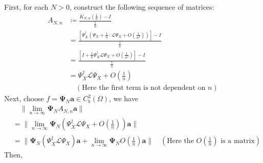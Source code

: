 \documentclass{article}[11]
\begin{document}
First, for each $N>0$, construct the following sequence of matrices:
\begin{align*}
	A_{N,n} &\coloneqq \frac{ K_{N,n}\left( \tfrac{1}{n} \right)  - I }{\tfrac{1}{n}} \\
	&= \frac{ \left[\Psi_X^{\dagger}\left(\Psi_X + \tfrac{1}{n} \cdot \mathcal{L}\Psi_X + O(\tfrac{1}{n^2})\right)\right]  - I }{\tfrac{1}{n}} \\
	&= \frac{ \left[I + \tfrac{1}{n}\Psi_X^{\dagger}\mathcal{L}\Psi_X + O(\tfrac{1}{n^2})\right]  - I }{\tfrac{1}{n}} \\
	&= \Psi_X^{\dagger}\mathcal{L}\Psi_X + O(\tfrac{1}{n}) \\
	&\quad (\text{Here the first term is not dependent on $n$})
\end{align*}
Next, choose $f = \mathbf{\Psi}_N\mathbf{a} \in C_b^2(\Omega)$, we have
\begin{align*}
	&\quad \|\lim_{n\to\infty} \mathbf{\Psi}_N A_{N,n}\mathbf{a}\| \\
	&= \|\lim_{n\to\infty} \mathbf{\Psi}_N\left(\Psi_X^{\dagger}\mathcal{L}\Psi_X + O(\tfrac{1}{n})\right)\mathbf{a}\| \\
	&= \|\mathbf{\Psi}_N\left(\Psi_X^{\dagger}\mathcal{L}\Psi_X\right)\mathbf{a} + \lim_{n\to\infty} \mathbf{\Psi}_N O(\tfrac{1}{n})\mathbf{a}\| \quad (\text{Here the $O(\tfrac{1}{n})$ is a matrix})
\end{align*}
Then,
\end{document}
